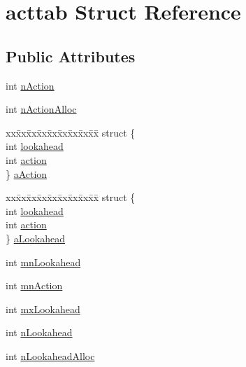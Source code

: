 \hypertarget{structacttab}{\section{acttab Struct Reference}
\label{structacttab}
}
\subsection*{Public Attributes}
\begin{DoxyCompactItemize}
\item 
int \hyperlink{structacttab_a8f1f0a4b91e02ffe3b978f0c7d5715f2}{n\-Action}
\item 
int \hyperlink{structacttab_a4836bf372ea8e78c0ff0cc23d7331330}{n\-Action\-Alloc}
\item 
\begin{tabbing}
xx\=xx\=xx\=xx\=xx\=xx\=xx\=xx\=xx\=\kill
struct \{\\
\>int \hyperlink{structacttab_ad0239fc4ae8bca58ca0ed9cb32871f0f}{lookahead}\\
\>int \hyperlink{structacttab_a980bd1056514d79ab9f2f28525e62965}{action}\\
\} \hyperlink{structacttab_a0e5f85ec55bf480d43321ce8afffd802}{aAction}\\

\end{tabbing}\item 
\begin{tabbing}
xx\=xx\=xx\=xx\=xx\=xx\=xx\=xx\=xx\=\kill
struct \{\\
\>int \hyperlink{structacttab_ad0239fc4ae8bca58ca0ed9cb32871f0f}{lookahead}\\
\>int \hyperlink{structacttab_a980bd1056514d79ab9f2f28525e62965}{action}\\
\} \hyperlink{structacttab_a70a311363e6cabef637f38b426d3f55c}{aLookahead}\\

\end{tabbing}\item 
int \hyperlink{structacttab_a0d7b48695b227d3b48e6fe61f2dcf41c}{mn\-Lookahead}
\item 
int \hyperlink{structacttab_a034d4761f4a67e49860504e4355cc37b}{mn\-Action}
\item 
int \hyperlink{structacttab_a466d035d73cff7999cbb4c3a1b8c763d}{mx\-Lookahead}
\item 
int \hyperlink{structacttab_ab4063b892cd8c9c11ae0a91630bc2ca2}{n\-Lookahead}
\item 
int \hyperlink{structacttab_aa776f649f69a622f6be07eaf538c700a}{n\-Lookahead\-Alloc}
\end{DoxyCompactItemize}


